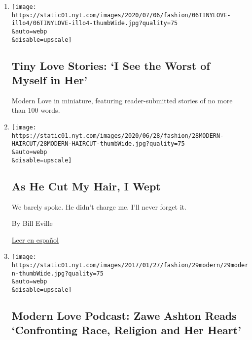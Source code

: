 \begin{enumerate}
\def\labelenumi{\arabic{enumi}.}
\item
  \href{/2020/06/30/style/tiny-modern-love-stories-coronavirus-i-see-the-worst-of-myself-in-her.html}{}

  \texttt{[image: https://static01.nyt.com/images/2020/07/06/fashion/06TINYLOVE-illo4/06TINYLOVE-illo4-thumbWide.jpg?quality=75\\\&auto=webp\\\&disable=upscale]}

  \hypertarget{tiny-love-stories-i-see-the-worst-of-myself-in-her}{%
  \subsection{Tiny Love Stories: `I See the Worst of Myself in
  Her'}\label{tiny-love-stories-i-see-the-worst-of-myself-in-her}}

  Modern Love in miniature, featuring reader-submitted stories of no
  more than 100 words.
\item
  \href{/2020/06/26/style/modern-love-coronavirus-as-he-cut-my-hair-i-wept.html}{}

  \texttt{[image: https://static01.nyt.com/images/2020/06/28/fashion/28MODERN-HAIRCUT/28MODERN-HAIRCUT-thumbWide.jpg?quality=75\\\&auto=webp\\\&disable=upscale]}

  \hypertarget{as-he-cut-my-hair-i-wept}{%
  \subsection{As He Cut My Hair, I
  Wept}\label{as-he-cut-my-hair-i-wept}}

  We barely spoke. He didn't charge me. I'll never forget it.

  By Bill Eville

  \href{https://www.nytimes.com/es/2020/07/05/espanol/estilos-de-vida/cancer-cabello.html}{Leer
  en español}
\item
  \href{/2020/06/24/style/modern-love-podcast-zawe-ashton.html}{}

  \texttt{[image: https://static01.nyt.com/images/2017/01/27/fashion/29modern/29modern-thumbWide.jpg?quality=75\\\&auto=webp\\\&disable=upscale]}

  \hypertarget{modern-love-podcast-zawe-ashton-reads-confronting-race-religion-and-her-heart}{%
  \subsection{Modern Love Podcast: Zawe Ashton Reads `Confronting Race,
  Religion and Her
  Heart'}\label{modern-love-podcast-zawe-ashton-reads-confronting-race-religion-and-her-heart}}


\end{enumerate}
